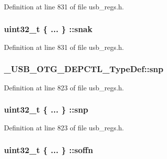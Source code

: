 Definition at line 831 of file usb\-\_\-regs.\-h.

\hypertarget{group___u_s_b___o_t_g___d_r_i_v_e_r_ga21341bc352558d181610a3f6ded69e13}{
\subsubsection[{snak}]{\setlength{\rightskip}{0pt plus 5cm}uint32\-\_\-t \{ ... \} \-::snak}}\label{group___u_s_b___o_t_g___d_r_i_v_e_r_ga21341bc352558d181610a3f6ded69e13}


Definition at line 831 of file usb\-\_\-regs.\-h.

\hypertarget{group___u_s_b___o_t_g___d_r_i_v_e_r_ga39db95db811c1ab0d6706d1105fc1875}{
\subsubsection[{snp}]{ \-\_\-\-U\-S\-B\-\_\-\-O\-T\-G\-\_\-\-D\-E\-P\-C\-T\-L\-\_\-\-Type\-Def\-::snp}}\label{group___u_s_b___o_t_g___d_r_i_v_e_r_ga39db95db811c1ab0d6706d1105fc1875}


Definition at line 823 of file usb\-\_\-regs.\-h.

\hypertarget{group___u_s_b___o_t_g___d_r_i_v_e_r_gaa8bb398c8e2914be4782941a7d28ea2e}{
\subsubsection[{snp}]{\setlength{\rightskip}{0pt plus 5cm}uint32\-\_\-t \{ ... \} \-::snp}}\label{group___u_s_b___o_t_g___d_r_i_v_e_r_gaa8bb398c8e2914be4782941a7d28ea2e}


Definition at line 823 of file usb\-\_\-regs.\-h.

\hypertarget{group___u_s_b___o_t_g___d_r_i_v_e_r_ga229b2ab9a75f0369ce47fd5d09158149}{
\subsubsection[{soffn}]{\setlength{\rightskip}{0pt plus 5cm}uint32\-\_\-t \{ ... \} \-::soffn}}\label{group___u_s_b___o_t_g___d_r_i_v_e_r_ga229b2ab9a75f0369ce47fd5d09158149}


